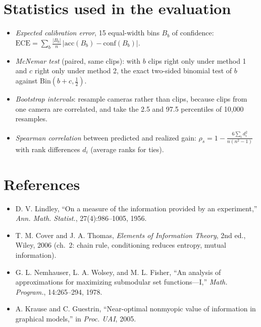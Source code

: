 \documentclass[11pt]{article}
\theoremstyle{plain}
\theoremstyle{remark}
\begin{document}
\section{Statistics used in the evaluation}
\begin{itemize}
  \item \emph{Expected calibration error}, 15 equal-width bins $B_b$ of confidence: $\mathrm{ECE}=\sum_b\frac{|B_b|}{n}\,\big|\mathrm{acc}(B_b)-\mathrm{conf}(B_b)\big|$.
  \item \emph{McNemar test} (paired, same clips): with $b$ clips right only under method 1 and $c$ right only under method 2, the exact two-sided binomial test of $b$ against $\mathrm{Bin}(b+c,\frac12)$.
  \item \emph{Bootstrap intervals}: resample cameras rather than clips, because clips from one camera are correlated, and take the 2.5 and 97.5 percentiles of 10{,}000 resamples.
  \item \emph{Spearman correlation} between predicted and realized gain: $\rho_s=1-\frac{6\sum_id_i^2}{n(n^2-1)}$ with rank differences $d_i$ (average ranks for ties).
\end{itemize}

\section*{References}
{\small
\begin{itemize}[leftmargin=1.2em]
  \item D. V. Lindley, ``On a measure of the information provided by an experiment,'' \emph{Ann. Math. Statist.}, 27(4):986--1005, 1956.
  \item T. M. Cover and J. A. Thomas, \emph{Elements of Information Theory}, 2nd ed., Wiley, 2006 (ch.~2: chain rule, conditioning reduces entropy, mutual information).
  \item G. L. Nemhauser, L. A. Wolsey, and M. L. Fisher, ``An analysis of approximations for maximizing submodular set functions---I,'' \emph{Math. Program.}, 14:265--294, 1978.
  \item A. Krause and C. Guestrin, ``Near-optimal nonmyopic value of information in graphical models,'' in \emph{Proc. UAI}, 2005.
\end{itemize}}
\end{document}
